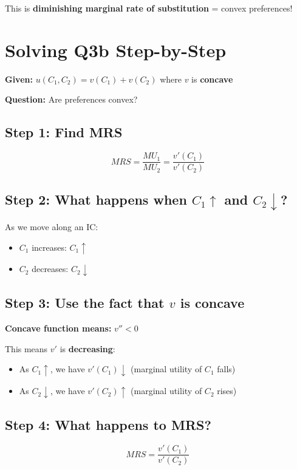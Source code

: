 \documentclass[12pt]{article}
\begin{document}
This is \textbf{diminishing marginal rate of substitution} = convex preferences!

\newpage

\section*{Solving Q3b Step-by-Step}

\textbf{Given:} $u(C_1, C_2) = v(C_1) + v(C_2)$ where $v$ is \textbf{concave}

\textbf{Question:} Are preferences convex?

\subsection*{Step 1: Find MRS}

\[
MRS = \frac{MU_1}{MU_2} = \frac{v'(C_1)}{v'(C_2)}
\]

\subsection*{Step 2: What happens when $C_1 \uparrow$ and $C_2 \downarrow$?}

As we move along an IC:
\begin{itemize}
\item $C_1$ increases: $C_1 \uparrow$
\item $C_2$ decreases: $C_2 \downarrow$
\end{itemize}

\subsection*{Step 3: Use the fact that $v$ is concave}

\textbf{Concave function means:} $v'' < 0$

This means $v'$ is \textbf{decreasing}:
\begin{itemize}
\item As $C_1 \uparrow$, we have $v'(C_1) \downarrow$ (marginal utility of $C_1$ falls)
\item As $C_2 \downarrow$, we have $v'(C_2) \uparrow$ (marginal utility of $C_2$ rises)
\end{itemize}

\subsection*{Step 4: What happens to MRS?}

\[
MRS = \frac{v'(C_1)}{v'(C_2)}
\]
\end{document}
